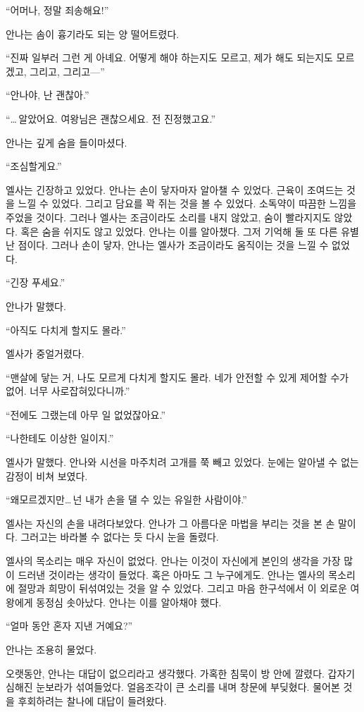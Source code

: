 ``어머나, 정말 죄송해요!''

안나는 솜이 흉기라도 되는 양 떨어트렸다.

``진짜 일부러 그런 게 아녜요. 어떻게 해야 하는지도 모르고, 제가 해도 되는지도 모르겠고, 그리고, 그리고—''

``안나야, 난 괜찮아.''

``\ldots\,알았어요. 여왕님은 괜찮으세요. 전 진정했고요.''

안나는 깊게 숨을 들이마셨다.

``조심할게요.''

엘사는 긴장하고 있었다. 안나는 손이 닿자마자 알아챌 수 있었다. 근육이 조여드는 것을 느낄 수 있었다. 그리고 담요를 꽉 쥐는 것을 볼 수 있었다. 소독약이 따끔한 느낌을 주었을 것이다. 그러나 엘사는 조금이라도 소리를 내지 않았고, 숨이 빨라지지도 않았다. 혹은 숨을 쉬지도 않고 있었다. 안나는 이를 알아챘다. 그저 기억해 둘 또 다른 유별난 점이다. 그러나 손이 닿자, 안나는 엘사가 조금이라도 움직이는 것을 느낄 수 없었다.

``긴장 푸세요.''

안나가 말했다.

``아직도 다치게 할지도 몰라.''

엘사가 중얼거렸다.

``맨살에 닿는 거, 나도 모르게 다치게 할지도 몰라. 네가 안전할 수 있게 제어할 수가 없어. 너무 사로잡혀있다니까.''

``전에도 그랬는데 아무 일 없었잖아요.''

``나한테도 이상한 일이지.''

엘사가 말했다. 안나와 시선을 마주치려 고개를 쭉 빼고 있었다. 눈에는 알아낼 수 없는 감정이 비쳐 보였다.

``왜 모르겠지만\ldots\,넌 내가 손을 댈 수 있는 유일한 사람이야.''

엘사는 자신의 손을 내려다보았다. 안나가 그 아름다운 마법을 부리는 것을 본 손 말이다. 그러고는 바라볼 수 없다는 듯 다시 눈을 돌렸다.

엘사의 목소리는 매우 자신이 없었다. 안나는 이것이 자신에게 본인의 생각을 가장 많이 드러낸 것이라는 생각이 들었다. 혹은 아마도 그 누구에게도. 안나는 엘사의 목소리에 절망과 희망이 뒤섞여있는 것을 알 수 있었다. 그리고 마음 한구석에서 이 외로운 여왕에게 동정심 솟아났다. 안나는 이를 알아채야 했다.

``얼마 동안 혼자 지낸 거예요?''

안나는 조용히 물었다.

오랫동안, 안나는 대답이 없으리라고 생각했다. 가혹한 침묵이 방 안에 깔렸다. 갑자기 심해진 눈보라가 섞여들었다. 얼음조각이 큰 소리를 내며 창문에 부딪혔다. 물어본 것을 후회하려는 찰나에 대답이 들려왔다.

